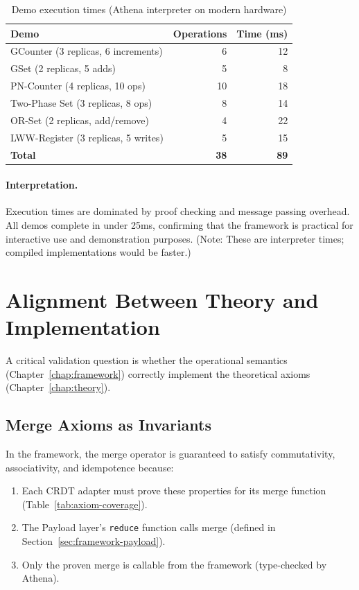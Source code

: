 \begin{table}[t]
  \centering
  \caption{Demo execution times (Athena interpreter on modern hardware)}
  \label{tab:execution-times}
  \small
  \begin{tabular}{lrr}
    \toprule
    \textbf{Demo} & \textbf{Operations} & \textbf{Time (ms)}\\
    \midrule
    GCounter (3 replicas, 6 increments) & 6 & 12\\
    GSet (2 replicas, 5 adds) & 5 & 8\\
    PN-Counter (4 replicas, 10 ops) & 10 & 18\\
    Two-Phase Set (3 replicas, 8 ops) & 8 & 14\\
    OR-Set (2 replicas, add/remove) & 4 & 22\\
    LWW-Register (3 replicas, 5 writes) & 5 & 15\\
    \midrule
    \textbf{Total} & \textbf{38} & \textbf{89}\\
    \bottomrule
  \end{tabular}
\end{table}

\paragraph{Interpretation.}
Execution times are dominated by proof checking and message passing overhead. All demos complete in under 25ms, confirming that the framework is practical for interactive use and demonstration purposes. (Note: These are interpreter times; compiled implementations would be faster.)

\section{Alignment Between Theory and Implementation}\label{sec:theory-alignment}

A critical validation question is whether the operational semantics (Chapter~\ref{chap:framework}) correctly implement the theoretical axioms (Chapter~\ref{chap:theory}).

\subsection{Merge Axioms as Invariants}

In the framework, the merge operator is guaranteed to satisfy commutativity, associativity, and idempotence because:

\begin{enumerate}
  \item Each CRDT adapter must prove these properties for its merge function (Table~\ref{tab:axiom-coverage}).
  \item The Payload layer's \texttt{reduce} function calls merge (defined in Section~\ref{sec:framework-payload}).
  \item Only the proven merge is callable from the framework (type-checked by Athena).
\end{enumerate}

